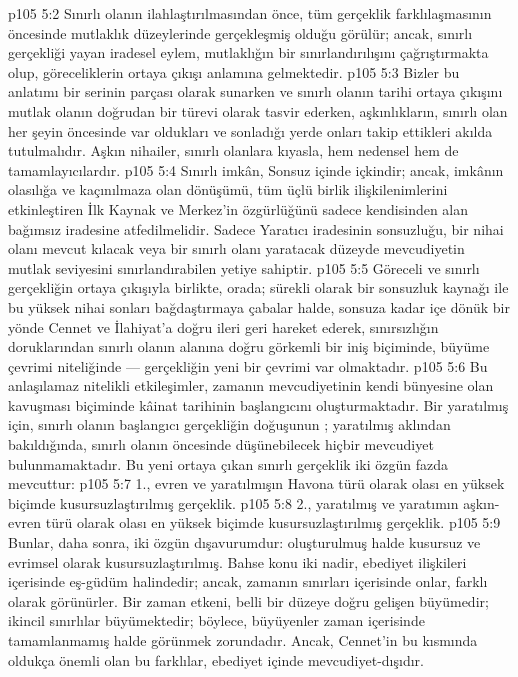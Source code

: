 \vs p105 5:2 Sınırlı olanın ilahlaştırılmasından önce, tüm gerçeklik farklılaşmasının öncesinde mutlaklık düzeylerinde gerçekleşmiş olduğu görülür; ancak, sınırlı gerçekliği yayan iradesel eylem, mutlaklığın bir sınırlandırılışını çağrıştırmakta olup, göreceliklerin ortaya çıkışı anlamına gelmektedir.
\vs p105 5:3 Bizler bu anlatımı bir serinin parçası olarak sunarken ve sınırlı olanın tarihi ortaya çıkışını mutlak olanın doğrudan bir türevi olarak tasvir ederken, aşkınlıkların, sınırlı olan her şeyin öncesinde var oldukları ve sonladığı yerde onları takip ettikleri akılda tutulmalıdır. Aşkın nihailer, sınırlı olanlara kıyasla, hem nedensel hem de tamamlayıcılardır.
\vs p105 5:4 Sınırlı imkân, Sonsuz içinde içkindir; ancak, imkânın olasılığa ve kaçınılmaza olan dönüşümü, tüm üçlü birlik ilişkilenimlerini etkinleştiren İlk Kaynak ve Merkez’in özgürlüğünü sadece kendisinden alan bağımsız iradesine atfedilmelidir. Sadece Yaratıcı iradesinin sonsuzluğu, bir nihai olanı mevcut kılacak veya bir sınırlı olanı yaratacak düzeyde mevcudiyetin mutlak seviyesini sınırlandırabilen yetiye sahiptir.
\vs p105 5:5 Göreceli ve sınırlı gerçekliğin ortaya çıkışıyla birlikte, orada; sürekli olarak bir sonsuzluk kaynağı ile bu yüksek nihai sonları bağdaştırmaya çabalar halde, sonsuza kadar içe dönük bir yönde Cennet ve İlahiyat’a doğru ileri geri hareket ederek, sınırsızlığın doruklarından sınırlı olanın alanına doğru görkemli bir iniş biçiminde, büyüme çevrimi niteliğinde --- gerçekliğin yeni bir çevrimi var olmaktadır.
\vs p105 5:6 Bu anlaşılamaz nitelikli etkileşimler, zamanın mevcudiyetinin kendi bünyesine olan kavuşması biçiminde kâinat tarihinin başlangıcını oluşturmaktadır. Bir yaratılmış için, sınırlı olanın başlangıcı gerçekliğin doğuşunun ; yaratılmış aklından bakıldığında, sınırlı olanın öncesinde düşünebilecek hiçbir mevcudiyet bulunmamaktadır. Bu yeni ortaya çıkan sınırlı gerçeklik iki özgün fazda mevcuttur:
\vs p105 5:7 1., evren ve yaratılmışın Havona türü olarak olası en yüksek biçimde kusursuzlaştırılmış gerçeklik.
\vs p105 5:8 2.\bibnobreakspace {}, yaratılmış ve yaratımın aşkın\hyp{}evren türü olarak olası en yüksek biçimde kusursuzlaştırılmış gerçeklik.
\vs p105 5:9 Bunlar, daha sonra, iki özgün dışavurumdur: oluşturulmuş halde kusursuz ve evrimsel olarak kusursuzlaştırılmış. Bahse konu iki nadir, ebediyet ilişkileri içerisinde eş\hyp{}güdüm halindedir; ancak, zamanın sınırları içerisinde onlar, farklı olarak görünürler. Bir zaman etkeni, belli bir düzeye doğru gelişen büyümedir; ikincil sınırlılar büyümektedir; böylece, büyüyenler zaman içerisinde tamamlanmamış halde görünmek zorundadır. Ancak, Cennet’in bu kısmında oldukça önemli olan bu farklılar, ebediyet içinde mevcudiyet\hyp{}dışıdır.

